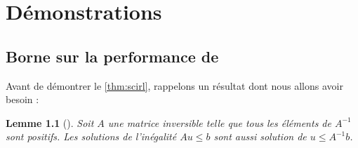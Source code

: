 \documentclass[frenchb,a4paper,justified,notoc]{tufte-book}
\newtheorem{lemma}{Lemme}
\begin{document}
\appendix
\chapter{Démonstrations}
\label{sec-8}
\label{hier-demo}
\section{Borne sur la performance de }
\label{sec-8-1}

Avant de démontrer le \autoref{thm:scirl}, rappelons un résultat dont nous allons avoir besoin :
\begin{lemma}[{\citep[Lemme 4.2]{munos2007performance}}]
Soit $A$ une matrice inversible telle que tous les éléments de $A^{-1}$ sont positifs. Les solutions de l'inégalité $Au\leq b$ sont aussi solution de $u\leq A^{-1}b$.
\end{lemma}
\end{document}

